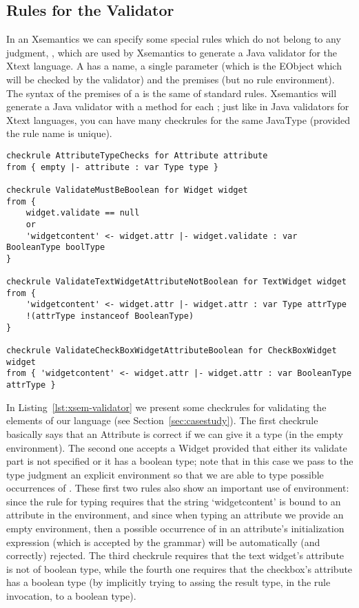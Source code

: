 \subsection{Rules for the Validator}
\label{sec:xsem-validation}

In an Xsemantics we can specify some special rules which do not belong to any
judgment, , which are used by Xsemantics to generate a Java
validator for the Xtext language.  A  has a name, a single
parameter (which is the EObject which will be checked by the validator) and the
premises (but no rule environment).  The syntax of the premises of a
 is the same of standard rules.
Xsemantics will generate a Java validator with a \checkm{} method for each
; just like in Java validators for Xtext languages, you can have
many checkrules for the same JavaType (provided the rule name is unique).

\begin{lstlisting}[language=xsemantics,float,label=lst:xsem-validator,caption=Some
checkrules for the Validator.] 
checkrule AttributeTypeChecks for Attribute attribute
from { empty |- attribute : var Type type }

checkrule ValidateMustBeBoolean for Widget widget
from {
	widget.validate == null
	or 
	'widgetcontent' <- widget.attr |- widget.validate : var BooleanType boolType
}

checkrule ValidateTextWidgetAttributeNotBoolean for TextWidget widget
from {
	'widgetcontent' <- widget.attr |- widget.attr : var Type attrType
	!(attrType instanceof BooleanType)
}

checkrule ValidateCheckBoxWidgetAttributeBoolean for CheckBoxWidget widget
from { 'widgetcontent' <- widget.attr |- widget.attr : var BooleanType attrType }
\end{lstlisting}

In Listing~\ref{lst:xsem-validator} we present some checkrules for validating
the elements of our language (see Section~\ref{sec:casestudy}).  The first
checkrule basically says that an Attribute is correct if we can give it a type
(in the empty environment).  The second one accepts a Widget provided that
either its validate part is not specified or it has a boolean type; note that in
this case we pass to the type judgment an explicit environment so that we are
able to type possible occurrences of .  These first two
rules also show an important use of environment: since the rule for typing
 requires that the string `widgetcontent' is bound to an
attribute in the environment, and since when typing an attribute we provide an
empty environment, then a possible occurrence of  in an
attribute's initialization expression (which is accepted by the grammar) will be
automatically (and correctly) rejected.
The third checkrule requires that the text widget's attribute is not of boolean
type, while the fourth one requires that the checkbox's attribute has a boolean
type (by implicitly trying to assing the result type, in the rule invocation, to
a boolean type).
